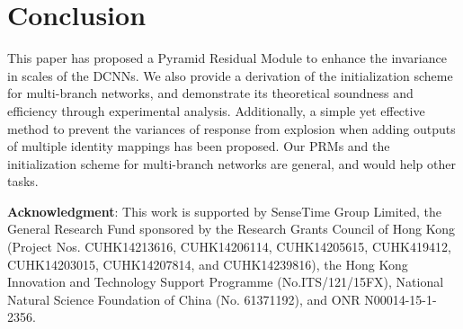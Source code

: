 \documentclass[10pt,twocolumn,letterpaper]{article}
\newcommand{\smalltitle}[1]{\vspace{0.2em}\noindent \textbf{{#1}}}
\begin{document}
\section{Conclusion}
This paper has proposed a Pyramid Residual Module to enhance the invariance in scales of the DCNNs. 
We also provide a derivation of the initialization scheme for multi-branch networks, and demonstrate its theoretical soundness and efficiency through experimental analysis. 
Additionally, a simple yet effective method to prevent the variances of response from explosion when adding outputs of multiple identity mappings has been proposed. 
Our PRMs and the initialization scheme for multi-branch networks are general, and would help other tasks.

\smalltitle{Acknowledgment}: 
This work is supported by SenseTime Group Limited, the General Research Fund sponsored by the Research Grants Council of Hong Kong (Project Nos. CUHK14213616, CUHK14206114, CUHK14205615, CUHK419412, CUHK14203015, CUHK14207814, and CUHK14239816), the Hong Kong Innovation and Technology Support Programme (No.ITS/121/15FX), National Natural Science Foundation of China (No. 61371192), and ONR N00014-15-1-2356. 

{\small


}
\end{document}
